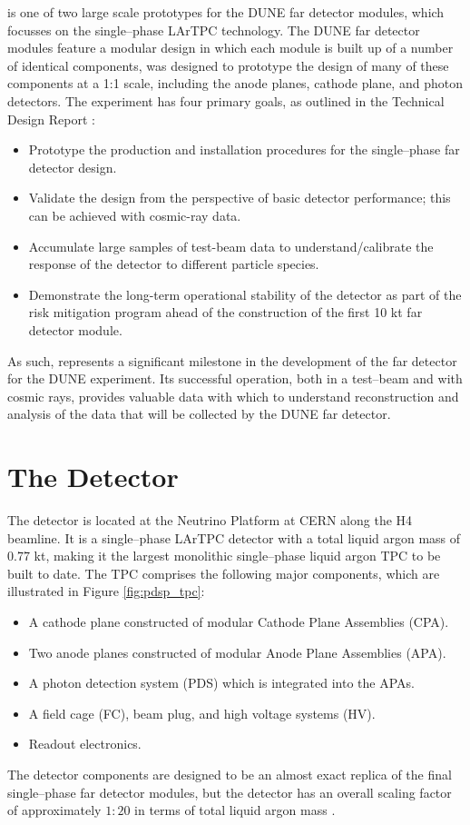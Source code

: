 \protodune{} is one of two large scale prototypes for the DUNE far detector
modules, which focusses on the single--phase LArTPC technology. The DUNE far
detector modules feature a modular design in which each module is built up of a
number of identical components, \protodune{} was designed to prototype the
design of many of these components at a 1:1 scale, including the anode planes,
cathode plane, and photon detectors. The \protodune{} experiment has four 
primary goals, as outlined in the Technical Design Report \cite{Abi2017}:
\begin{itemize}
	\item Prototype the production and installation procedures for the
		single--phase far detector design.
	\item Validate the design from the perspective of basic detector performance;
		this can be achieved with cosmic-ray data. 
	\item Accumulate large samples of test-beam data to understand/calibrate the
		response of the detector to different particle species.
	\item Demonstrate the long-term operational stability of the detector as part
		of the risk mitigation program ahead of the construction of the first 10 kt
		far detector module.
\end{itemize}
As such, \protodune{} represents a significant milestone in the development of
the far detector for the DUNE experiment. Its successful operation, both in a 
test--beam and with cosmic rays, provides valuable data with which to understand
reconstruction and analysis of the data that will be collected by the DUNE far 
detector.

\section{The \protodune{} Detector} \label{sec:pdsp_detector}

The \protodune{} detector is located at the Neutrino Platform at CERN along the
H4 beamline. It is a single--phase LArTPC detector with a total liquid argon 
mass of 0.77 kt, making it the largest monolithic single--phase liquid argon TPC
to be built to date. The TPC comprises the following major components, which 
are illustrated in Figure \ref{fig:pdsp_tpc}:
\begin{itemize}
	\item A cathode plane constructed of modular Cathode Plane Assemblies (CPA).
	\item Two anode planes constructed of modular Anode Plane Assemblies (APA).
	\item A photon detection system (PDS) which is integrated into the APAs.
	\item A field cage (FC), beam plug, and high voltage systems (HV).
	\item Readout electronics.
\end{itemize}
The detector components are designed to be an almost exact replica of the final 
single--phase far detector modules, but the detector has an overall scaling 
factor of approximately $1:20$ in terms of total liquid argon mass 
\cite{Abi2017}.

